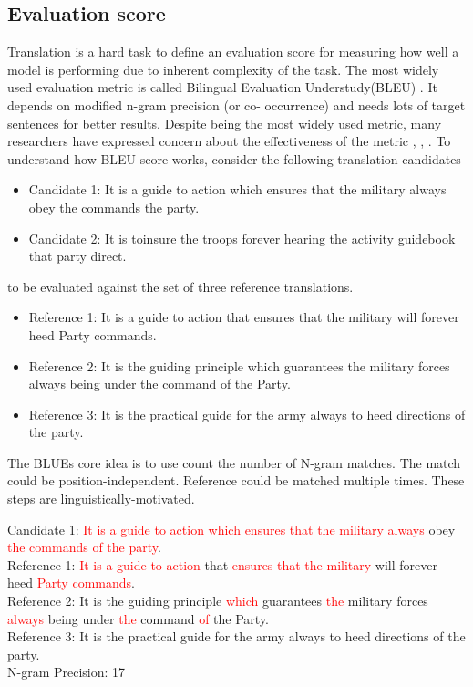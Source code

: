 \documentclass[a4paper]{article}
\newcommand{\red}[1]{\textcolor{red}{#1}}
\begin{document}
\subsection{Evaluation score}

Translation is a hard task to define an evaluation score for measuring how  well
a model is performing due to inherent complexity  of the  task.  The most widely
used  evaluation   metric   is  called   Bilingual  Evaluation  Understudy(BLEU)
\cite{papineni2002bleu}.  It  depends  on  modified  n-gram  precision  (or  co-
occurrence) and needs lots of target sentences for better results. Despite being
the most widely  used  metric, many researchers have expressed concern about the
effectiveness of the metric \cite{zhang2004interpreting}, \cite{callison2006re},
\cite{ananthakrishnan2007some}. To understand how BLEU score works, consider the
following translation candidates


\begin{itemize}
  \item Candidate 1: It is  a  guide to action which ensures that  the  military
        always obey  the commands the  party.
  \item Candidate 2: It is  toinsure the troops  forever  hearing  the  activity
        guidebook that party  direct.
\end{itemize}


to be evaluated against the set of three reference translations.


\begin{itemize}
  \item Reference 1: It is a guide to action that ensures that the military will
        forever heed Party commands.
  \item Reference 2: It is the  guiding  principle which guarantees the military
        forces always being under the command of the Party.
  \item Reference 3: It  is  the  practical  guide  for  the army always to heed
        directions of the party.
\end{itemize}


The  BLUEs core idea is to use  count the  number  of N-gram  matches. The match
could  be position-independent. Reference could be matched multiple times. These
steps are linguistically-motivated.

Candidate  1:  \red{It is  a  guide to action which  ensures  that  the military
always} obey \red{the commands of the party}. \\
Reference 1: \red{It is a guide  to action} that \red{ensures that the military}
will forever heed \red{Party commands}. \\
Reference  2:  It  is  the  guiding principle  \red{which}  guarantees \red{the}
military forces \red{always}  being under  \red{the} command \red{of} the Party.
\\
Reference 3: It is the practical guide for the army always to heed directions of
the party. \\
N-gram Precision: 17
\end{document}
